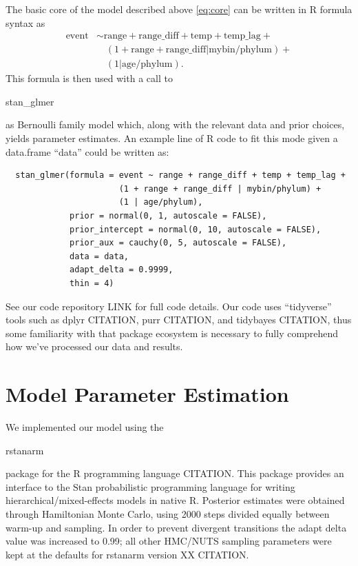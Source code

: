 \documentclass[12pt,letterpaper]{article}
\begin{document}
The basic core of the model described above \ref{eq:core} can be written in R formula syntax as
\begin{equation}
  \begin{aligned}
    \text{event} &\sim \text{range} + \text{range\_diff} + \text{temp} + \text{temp\_lag} + \\
    &\quad (1 + \text{range} + \text{range\_diff} | \text{mybin} / \text{phylum}) + \\
    &\quad (1 | \text{age} / \text{phylum}).
  \end{aligned}
\end{equation}
This formula is then used with a call to \begin{texttt} stan\_glmer \end{texttt} as Bernoulli family model which, along with the relevant data and prior choices, yields parameter estimates. An example line of R code to fit this mode given a data.frame ``data'' could be written as:
\begin{verbatim}
  stan_glmer(formula = event ~ range + range_diff + temp + temp_lag + 
                       (1 + range + range_diff | mybin/phylum) + 
                       (1 | age/phylum), 
             prior = normal(0, 1, autoscale = FALSE), 
             prior_intercept = normal(0, 10, autoscale = FALSE), 
             prior_aux = cauchy(0, 5, autoscale = FALSE), 
             data = data, 
             adapt_delta = 0.9999, 
             thin = 4)
\end{verbatim}

See our code repository LINK for full code details. Our code uses ``tidyverse'' tools such as dplyr CITATION, purr CITATION, and tidybayes CITATION, thus some familiarity with that package ecosystem is necessary to fully comprehend how we've processed our data and results.

\section{Model Parameter Estimation}

We implemented our model using the \begin{texttt}rstanarm\end{texttt} package for the R programming language CITATION. This package provides an interface to the Stan probabilistic programming language for writing hierarchical/mixed-effects models in native R. Posterior estimates were obtained through Hamiltonian Monte Carlo, using 2000 steps divided equally between warm-up and sampling. In order to prevent divergent transitions the adapt delta value was increased to 0.99; all other HMC/NUTS sampling parameters were kept at the defaults for rstanarm version XX CITATION. 
\end{document}
